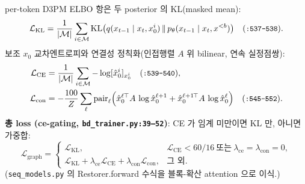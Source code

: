\documentclass[11pt]{article}
\newcommand{\code}[1]{\texttt{\small #1}}
\newcommand{\pth}{p_\theta}
\newcommand{\xz}{x_0}
\newcommand{\xt}{x_t}
\newcommand{\xpre}{x^{<b}}
\newcommand{\bLM}{\mathcal{M}}
\DeclareMathOperator{\KL}{KL}
\theoremstyle{definition}
\begin{document}
per-token D3PM ELBO 항은 두 posterior 의 KL(masked mean):
\begin{equation}
\mathcal L_{\text{KL}}=\frac{1}{|\bLM|}\sum_{i\in\bLM}\KL\!\big(q(x_{t-1}\mid \xt,\xz^i)\,\|\,\pth(x_{t-1}\mid \xt,\xpre)\big)
\quad(\code{:537--538}).
\end{equation}
보조 $x_0$ 교차엔트로피와 연결성 정칙화(인접행렬 $A$ 위 bilinear, 연속 실정점쌍):
\begin{align}
\mathcal L_{\text{CE}}&=\frac{1}{|\bLM|}\sum_{i\in\bLM}-\log[\hat{x}_0^i]_{\xz^i}
\quad(\code{:539--540}),\\
\mathcal L_{\text{con}}&=-\frac{100}{Z}\sum_{\ell}\text{pair}_\ell\Big(
\hat{x}_0^{\ell}{}^{\!\top} A\,\log\hat{x}_0^{\ell+1}
+\hat{x}_0^{\ell+1}{}^{\!\top} A\,\log\hat{x}_0^{\ell}\Big)
\quad(\code{:545--552}).
\end{align}
\textbf{총 loss (ce-gating, \code{bd\_trainer.py:39--52})}: CE 가 임계 미만이면 KL 만, 아니면 가중합:
\begin{equation}
\boxed{\;\mathcal L_{\text{graph}}=
\begin{cases}
\mathcal L_{\text{KL}}, & \mathcal L_{\text{CE}}<60/16\ \text{또는}\ \lambda_{\text{ce}}{=}\lambda_{\text{con}}{=}0,\\[2pt]
\mathcal L_{\text{KL}}+\lambda_{\text{ce}}\mathcal L_{\text{CE}}+\lambda_{\text{con}}\mathcal L_{\text{con}}, & \text{그 외.}
\end{cases}\;}
\end{equation}
(\code{seq\_models.py} 의 Restorer.forward 수식을 블록-확산 attention 으로 이식.)

\end{document}
